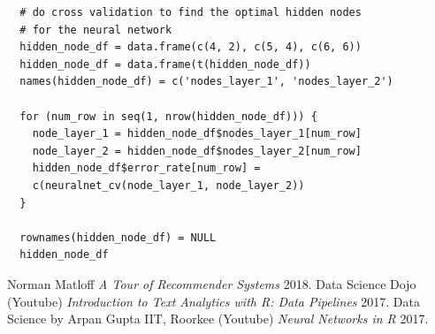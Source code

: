 \documentclass{article}
\begin{document}
\begin{verbatim}
  # do cross validation to find the optimal hidden nodes 
  # for the neural network
  hidden_node_df = data.frame(c(4, 2), c(5, 4), c(6, 6))
  hidden_node_df = data.frame(t(hidden_node_df))
  names(hidden_node_df) = c('nodes_layer_1', 'nodes_layer_2')

  for (num_row in seq(1, nrow(hidden_node_df))) {
    node_layer_1 = hidden_node_df$nodes_layer_1[num_row]
    node_layer_2 = hidden_node_df$nodes_layer_2[num_row]
    hidden_node_df$error_rate[num_row] = 
    c(neuralnet_cv(node_layer_1, node_layer_2))
  }

  rownames(hidden_node_df) = NULL
  hidden_node_df
\end{verbatim}

\begin{thebibliography}{1}

   Norman Matloff {\em A Tour of Recommender Systems}  2018.
   Data Science Dojo (Youtube) {\em Introduction to Text Analytics with R: Data Pipelines}  2017.
   Data Science by Arpan Gupta IIT, Roorkee (Youtube) {\em Neural Networks in R}  2017.
  
\end{thebibliography}
\end{document}
